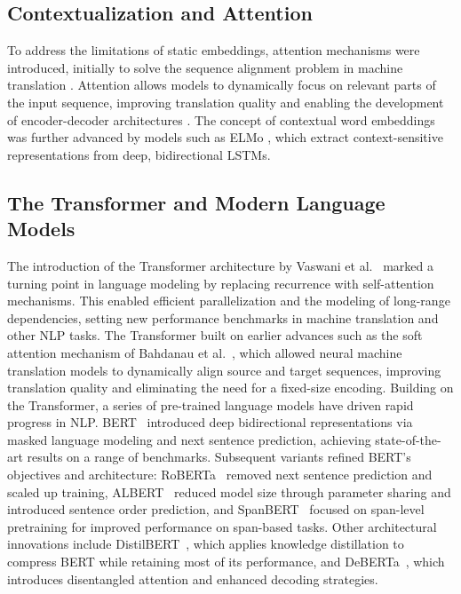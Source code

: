 \subsection{Contextualization and Attention}
To address the limitations of static embeddings, attention mechanisms were introduced, initially to solve the sequence alignment problem in machine translation \citep{bahdanau2015neural,luong2015effective}. Attention allows models to dynamically focus on relevant parts of the input sequence, improving translation quality and enabling the development of encoder-decoder architectures \citep{sutskever2014sequence}. The concept of contextual word embeddings was further advanced by models such as ELMo \citep{peters2018deep}, which extract context-sensitive representations from deep, bidirectional LSTMs.

\subsection{The Transformer and Modern Language Models}
The introduction of the Transformer architecture by Vaswani et al.~\citep{vaswani2017attention} marked a turning point in language modeling by replacing recurrence with self-attention mechanisms. This enabled efficient parallelization and the modeling of long-range dependencies, setting new performance benchmarks in machine translation and other NLP tasks. The Transformer built on earlier advances such as the soft attention mechanism of Bahdanau et al.~\citep{bahdanau2015neural}, which allowed neural machine translation models to dynamically align source and target sequences, improving translation quality and eliminating the need for a fixed-size encoding.
Building on the Transformer, a series of pre-trained language models have driven rapid progress in NLP. BERT~\citep{devlin2019bert} introduced deep bidirectional representations via masked language modeling and next sentence prediction, achieving state-of-the-art results on a range of benchmarks. Subsequent variants refined BERT’s objectives and architecture: RoBERTa~\citep{liu2019roberta} removed next sentence prediction and scaled up training, ALBERT~\citep{lan2019albert} reduced model size through parameter sharing and introduced sentence order prediction, and SpanBERT~\citep{joshi2020spanbert} focused on span-level pretraining for improved performance on span-based tasks. Other architectural innovations include DistilBERT~\citep{sanh2019distilbert}, which applies knowledge distillation to compress BERT while retaining most of its performance, and DeBERTa~\citep{he2021deberta}, which introduces disentangled attention and enhanced decoding strategies.
